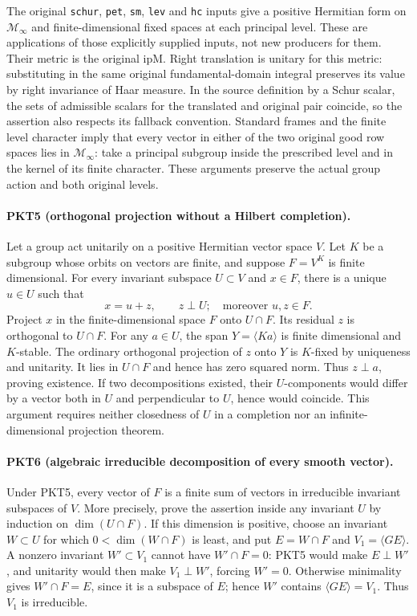 The original \texttt{schur}, \texttt{pet}, \texttt{sm}, \texttt{lev} and
\texttt{hc} inputs give a positive Hermitian form on $\mathcal M_\infty$
and finite-dimensional fixed spaces at each principal level.  These are
applications of those explicitly supplied inputs, not new producers for
them.  Their metric is the original $\mathrm{ipM}$.  Right translation is
unitary for this metric: substituting in the same original fundamental-domain
integral preserves its value by right invariance of Haar measure.  In the
source definition by a Schur scalar, the sets of admissible scalars for the
translated and original pair coincide, so the assertion also respects its
fallback convention.  Standard frames and the finite level character imply
that every vector in either of the two original good row spaces lies in
$\mathcal M_\infty$: take a principal subgroup inside the prescribed level
and in the kernel of its finite character.  These arguments preserve the
actual group action and both original levels.

\paragraph{PKT5 (orthogonal projection without a Hilbert completion).}\label{claim:PKT5}
Let a group act unitarily on a positive Hermitian vector space $V$.  Let
$K$ be a subgroup whose orbits on vectors are finite, and suppose
$F=V^K$ is finite dimensional.  For every invariant subspace $U\subset V$
and $x\in F$, there is a unique $u\in U$ such that
\[
 x=u+z,\qquad z\perp U;
 \quad\text{moreover }u,z\in F.\tag{PKT.5}
\]
Project $x$ in the finite-dimensional space $F$ onto $U\cap F$.  Its
residual $z$ is orthogonal to $U\cap F$.  For any $a\in U$, the span
$Y=\langle Ka\rangle$ is finite dimensional and $K$-stable.  The ordinary
orthogonal projection of $z$ onto $Y$ is $K$-fixed by uniqueness and
unitarity.  It lies in $U\cap F$ and hence has zero squared norm.  Thus
$z\perp a$, proving existence.  If two decompositions existed, their
$U$-components would differ by a vector both in $U$ and perpendicular to
$U$, hence would coincide.  This argument requires neither closedness of
$U$ in a completion nor an infinite-dimensional projection theorem.

\paragraph{PKT6 (algebraic irreducible decomposition of every smooth vector).}\label{claim:PKT6}
Under PKT5, every vector of $F$ is a finite sum of vectors in irreducible
invariant subspaces of $V$.  More precisely, prove the assertion inside any
invariant $U$ by induction on $\dim(U\cap F)$.  If this dimension is
positive, choose an invariant $W\subset U$ for which
$0<\dim(W\cap F)$ is least, and put $E=W\cap F$ and
$V_1=\langle GE\rangle$.  A nonzero invariant $W'\subset V_1$ cannot
have $W'\cap F=0$: PKT5 would make $E\perp W'$, and unitarity would then
make $V_1\perp W'$, forcing $W'=0$.  Otherwise minimality gives
$W'\cap F=E$, since it is a subspace of $E$; hence $W'$ contains
$\langle GE\rangle=V_1$.  Thus $V_1$ is irreducible.

